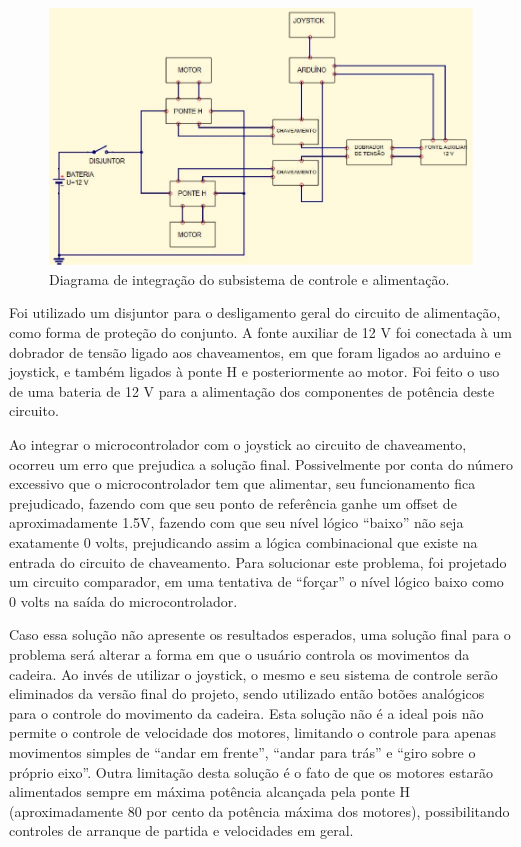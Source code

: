 \begin{figure}
    \begin{center}
        \includegraphics{figuras/circuito_integrado_cadeira.png}
    \end{center}
    \caption{Diagrama de integração do subsistema de controle e alimentação.}
    \label{fig:circuito_integrado_cadeira.png}
\end{figure}

Foi utilizado um disjuntor para o desligamento geral do circuito de alimentação, como forma de proteção do conjunto. A fonte auxiliar de 12 V foi conectada à um dobrador de tensão ligado aos chaveamentos, em que foram ligados ao arduino e joystick, e também ligados à ponte H e posteriormente ao motor. Foi feito o uso de uma bateria de 12 V para a alimentação dos componentes  de potência deste circuito.

Ao integrar o microcontrolador com o joystick ao circuito de chaveamento, ocorreu um erro que prejudica a solução final. Possivelmente por conta do número excessivo que o microcontrolador tem que alimentar, seu funcionamento fica prejudicado, fazendo com que seu ponto de referência ganhe um offset de aproximadamente 1.5V, fazendo com que seu nível lógico “baixo” não seja exatamente 0 volts, prejudicando assim a lógica combinacional que existe na entrada do circuito de chaveamento. Para solucionar este problema, foi projetado um circuito comparador, em uma tentativa de “forçar” o nível lógico baixo como 0 volts na saída do microcontrolador.

	Caso essa solução não apresente os resultados esperados, uma solução final para o problema será alterar a forma em que o usuário controla os movimentos da cadeira. Ao invés de utilizar o joystick, o mesmo e seu sistema de controle serão eliminados da versão final do projeto, sendo utilizado então botões analógicos para o controle do movimento da cadeira. Esta solução não é a ideal pois não permite o controle de velocidade dos motores, limitando o controle para apenas movimentos simples de “andar em frente”, “andar para trás” e “giro sobre o próprio eixo”. Outra limitação desta solução é o fato de que os motores estarão alimentados sempre em máxima potência alcançada pela ponte H (aproximadamente 80 por cento da potência máxima dos motores), possibilitando controles de arranque de partida e velocidades em geral.

